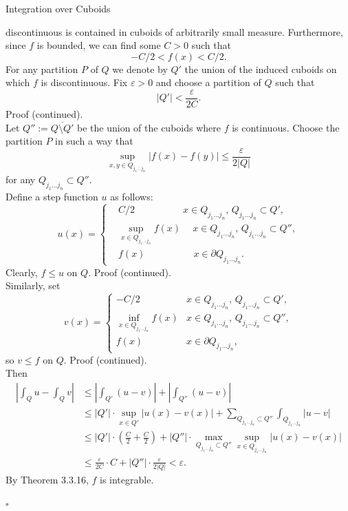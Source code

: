 \documentclass[smaller,hyperref={CJKbookmarks=true}]{beamer}
\begin{document}
\begin{frame}{Integration over Cuboids}
\begin{spacing}{1.05}
discontinuous is contained in
cuboids of
arbitrarily small measure.
Furthermore, since $f$ is bounded,
we can find
some $C>0$ such that
\[-C/2<f(x)<C/2.\]
For any partition $P$ of $Q$ we
denote by $Q'$ the union of the
induced cuboids on which $f$ is
discontinuous. Fix $\varepsilon>0$
and choose a partition of $Q$ such
that
\[|Q'|<\frac{\varepsilon}{2C}.\]
\newpage
\alert{Proof (continued).}\\
Let $Q'':=\overline{Q\setminus Q'}$ be the union of the cuboids where $f$ is continuous. Choose the partition $P$ in such a way that
\[\sup_{x,y\in Q_{j_1...j_n}}|f(x)-f(y)|\leq\frac{\varepsilon}{2|Q|}\]
for any $Q_{j_1...j_n}\subset Q''$.\\[4pt]
Define a step function $u$ as follows:
\begin{equation*}
  u(x)=\left\{\begin{aligned}
                &C/2\qquad\qquad\quad
                x\in Q_{j_1...j_n},\,Q_{j_1...j_n}\subset Q',\\
                &\sup\limits_{x\in Q_{j_1...j_n}}f(x)\quad\: x\in Q_{j_1...j_n},\,Q_{j_1...j_n}\subset Q'',\\
                &f(x)\qquad\qquad\quad
                x\in\partial Q_{j_1...j_n}.
              \end{aligned}\right.
\end{equation*}
Clearly, $f\leq u$ on $Q$.
\newpage
\alert{Proof (continued).}\\
Similarly, set
\begin{equation*}
  v(x)=\left\{\begin{array}{ll}
                -C/2 & x\in Q_{j_1...j_n},\,Q_{j_1...j_n}\subset Q', \\[3pt]
                \inf\limits_{x\in Q_{j_1...j_n}}f(x) & x\in Q_{j_1...j_n},\,Q_{j_1...j_n}\subset Q'',\\
                f(x) & x\in\partial Q_{j_1...j_n},
              \end{array}\right.
\end{equation*}
so $v\leq f$ on $Q$.
\newpage
\alert{Proof (continued).}\\
Then
\begin{equation*}
  \begin{split}
     \left|\int_Qu-\int_Qv\right| &\leq\left|\int_{Q'}(u-v)\right|
     +\left|\int_{Q''}(u-v)\right| \\
       &\leq|Q'|\cdot\sup_{x\in Q'}|
       u(x)-v(x)|+\sum_{Q_{j_1...j_n}\subset Q''}\int_{Q_{j_1...j_n}}|u-v| \\
       &\leq\vert Q'\vert\cdot\left(\frac{C}{2}+\frac{C}{2}\right)
       +|Q''|\cdot\max\limits_{Q_{j_1...j_n}\subset Q''}\sup\limits_{x\in Q_{j_1...j_n}}|u(x)-v(x)| \\
       &\leq\frac{\varepsilon}{2C}\cdot C+|Q''|\cdot\frac{\varepsilon}{2|Q|}<\varepsilon.
  \end{split}
\end{equation*}
By Theorem 3.3.16, $f$ is
integrable.
\begin{flushright}
  $\square$
\end{flushright}
\end{spacing}
\end{frame}
\end{document}
